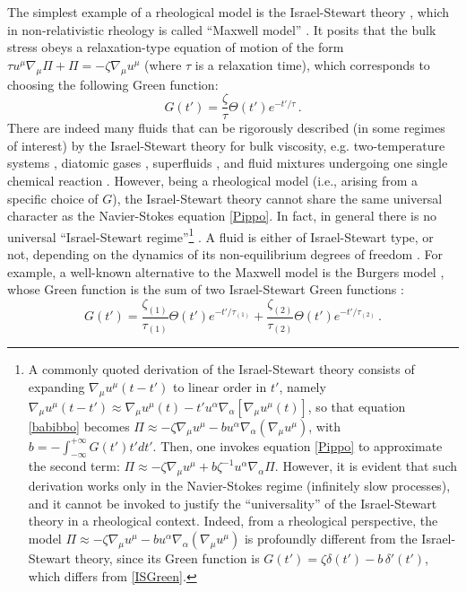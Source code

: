 \documentclass[a4paper, amsfonts, amssymb, amsmath, reprint, showkeys, nofootinbib, twoside, onecolumn,notitlepage]{revtex4-1}
\begin{document}
The simplest example of a rheological model is the Israel-Stewart theory \cite{Israel_Stewart_1979,Hishcock1983,Causality_bulk}, which in non-relativistic rheology is called ``Maxwell model'' \cite{maxwell_1867,Findley_book,BaggioliHolography}. It posits that the bulk stress obeys a relaxation-type equation of motion of the form $\tau u^\mu \nabla_\mu \Pi +\Pi = -\zeta \nabla_\mu u^\mu$ (where $\tau$ is a relaxation time), which corresponds to choosing the following Green function:
\begin{equation}\label{ISGreen}
G(t')=\dfrac{\zeta}{\tau}\Theta(t')e^{-t'/\tau} \, . 
\end{equation}
There are indeed many fluids that can be rigorously described (in some regimes of interest) by the Israel-Stewart theory for bulk viscosity, e.g. two-temperature systems \cite{GavassinoFronntiers2021}, diatomic gases \cite{Tisza_Bulk}, superfluids \cite{GavassinoKhalatnikov2022}, and fluid mixtures undergoing one single chemical reaction \cite{BulkGavassino}. However, being a rheological model (i.e., arising from a specific choice of $G$), the Israel-Stewart theory cannot share the same universal character as the Navier-Stokes equation \eqref{Pippo}. In fact, in general there is no universal ``Israel-Stewart regime''\footnote{A commonly quoted derivation of the Israel-Stewart theory \cite{Romatschke2017} consists of expanding $\nabla_\mu u^\mu(t{-}t')$ to linear order in $t'$, namely $\nabla_\mu u^\mu(t{-}t')\approx \nabla_\mu u^\mu(t)-t' u^\alpha \nabla_\alpha [\nabla_\mu u^\mu(t)]$, so that equation \eqref{babibbo} becomes $\Pi \approx -\zeta \nabla_\mu u^\mu -b u^\alpha \nabla_\alpha (\nabla_\mu u^\mu)$, with $b=-\int_{-\infty}^{+\infty} G(t')t'dt'$. Then, one invokes equation \eqref{Pippo} to approximate the second term: $\Pi \approx -\zeta \nabla_\mu u^\mu +b\zeta^{-1} u^\alpha \nabla_\alpha \Pi$. However, it is evident that such derivation works only in the Navier-Stokes regime (infinitely slow processes), and it cannot be invoked to justify the ``universality'' of the Israel-Stewart theory in a rheological context. Indeed, from a rheological perspective, the model $\Pi \approx -\zeta \nabla_\mu u^\mu -b u^\alpha \nabla_\alpha (\nabla_\mu u^\mu)$ is profoundly different from the Israel-Stewart theory, since its Green function is $G(t')=\zeta\delta(t')-b \, \delta'(t')$, which differs from \eqref{ISGreen}.} \cite{Geroch2001}. 
A fluid is either of Israel-Stewart type, or not, depending on the dynamics of its non-equilibrium degrees of freedom \cite{GavassinoUniversalityI2023,GavassinoUniversalityII2023}. For example, a well-known alternative to the Maxwell model is the Burgers model \cite{Findley_book}, whose Green function is the sum of two Israel-Stewart Green functions \cite{Malek2018}:
\begin{equation}\label{GtB}
G(t')= \dfrac{\zeta_{(1)}}{\tau_{(1)}}\Theta(t')e^{-t'/\tau_{(1)}} + \dfrac{\zeta_{(2)}}{\tau_{(2)}}\Theta(t')e^{-t'/\tau_{(2)}} \, . 
\end{equation}
\end{document}
